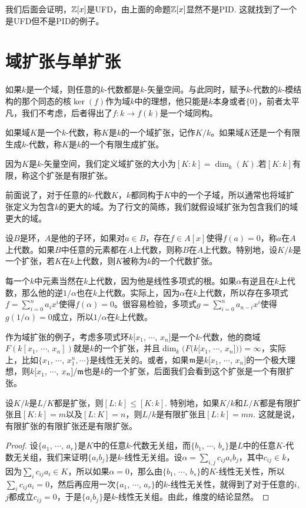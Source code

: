 我们后面会证明，$\mathbb{Z}[x]$是UFD，由上面的命题$\mathbb{Z}[x]$显然不是PID. 这就找到了一个是UFD但不是PID的例子。

\section{域扩张与单扩张}

如果$k$是一个域，则任意的$k$-代数都是$k$-矢量空间。与此同时，赋予$k$-代数的$k$-模结构的那个同态的核$\ker(f)$作为域$k$中的理想，他只能是$k$本身或者$\{0\}$，前者太平凡，我们不考虑，后者得出了$f:k\to f(k)$是一个域同构。

\para 如果域$K$是一个$k$-代数，称$K$是$k$的一个域扩张，记作$K/k$。如果域$K$还是一个有限生成$k$-代数，称$K$是$k$的一个有限生成扩张。

因为$K$是$k$-矢量空间，我们定义域扩张的大小为$[K:k]=\dim_k(K)$.若$[K:k]$有限，称这个扩张是有限扩张。

前面说了，对于任意的$k$-代数$K$，$k$都同构于$K$中的一个子域，所以通常也将域扩张定义为包含$k$的更大的域。为了行文的简练，我们就假设域扩张为包含我们的域更大的域。

\para 设$B$是环，$A$是他的子环，如果对$a\in B$，存在$f\in A[x]$使得$f(a)=0$，称$a$在$A$上代数。如果$B$中任意的元素都在$A$上代数，则称$B$在$A$上代数。特别地，设$K/k$是一个扩张，若$K$在$k$上代数，则$K$被称为$k$的一个代数扩张。

每一个$k$中元素当然在$k$上代数，因为他是线性多项式的根。如果$\alpha$有逆且在$k$上代数，那么他的逆$1/\alpha$也在$k$上代数。实际上，因为$\alpha$在$k$上代数，所以存在多项式$f=\sum_{i=0}^na_ix^i$使得$f(\alpha)=0$。很容易检验，多项式$g=\sum_{i=0}^na_{n-i}x^i$使得$g(1/\alpha)=0$成立，所以$1/\alpha$在$k$上代数。

作为域扩张的例子，考虑多项式环$k[x_1$, $\cdots$, $x_n]$是一个$k$-代数，他的商域$F(k[x_1,\,\cdots\!,\,x_n])$就是$k$的一个扩张，并且$\dim_k(F(k[x_1$, $\cdots$, $x_n]))=\infty$，实际上，比如$\{x_1$, $\cdots$, $x_1^n,\cdots\}$是线性无关的。或者，如果$\mathfrak{m}$是$k[x_1$, $\cdots$, $x_n]$的一个极大理想，则$k[x_1$, $\cdots$, $x_n]/\mathfrak{m}$也是$k$的一个扩张，后面我们会看到这个扩张是一个有限扩张。

\begin{pro}
设$K/k$是$L/K$都是扩张，则$[L:k]\leq[K:k]$. 特别地，如果$K/k$和$L/K$都是有限扩张且$[K:k]=m$以及$[L:K]=n$，则$L/k$是有限扩张且$[L:k]=mn$. 这就是说，有限扩张的有限扩张还是有限扩张。
\end{pro}

\begin{proof} 
	设$\{a_1$, $\cdots$, $a_r\}$是$K$中的任意$k$-代数无关组，而$\{b_1$, $\cdots$, $b_s\}$是$L$中的任意$K$-代数无关组，我们来证明$\{a_ib_j\}$是$k$-线性无关组。设$\alpha=\sum_{i,j}c_{ij}a_ib_j$，其中$c_{ij}\in k$，因为$\sum_i c_{ij}a_i\in K$，所以如果$\alpha=0$，那么由$\{b_1$, $\cdots$, $b_s\}$的$K$-线性无关性，所以$\sum_i c_{ij}a_i=0$，然后再应用一次$\{a_1$, $\cdots$, $a_r\}$的$k$-线性无关性，就得到了对于任意的$i$, $j$都成立$c_{ij}=0$，于是$\{a_ib_j\}$是$k$-线性无关组。由此，维度的结论显然。
\end{proof}


